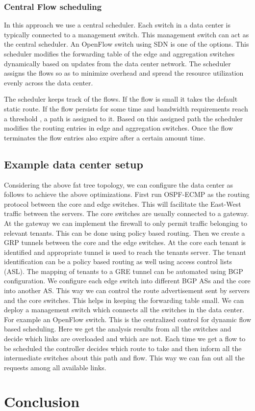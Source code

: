 \documentclass[11pt,letterpaper,onecolumn]{article}
\begin{document}
\subsubsection{Central Flow scheduling}
\par{\qquad In this approach we use a central scheduler. Each switch in a data center is typically connected to a management switch. This management switch can act as the central scheduler. An OpenFlow switch using SDN is one of the options. This scheduler modifies the forwarding table of the edge and aggregation switches dynamically based on updates from the data center network. The scheduler assigns the flows so as to minimize overhead and spread the resource utilization evenly across the data center.}\\

\par{The scheduler keeps track of the flows. If the flow is small it takes the default static route. If the flow persists for some time and bandwidth requirements reach a threshold , a path is assigned to it. Based on this assigned path the scheduler modifies the routing entries in edge and aggregation switches. Once the flow terminates the flow entries also expire after a certain amount time.}\\

\subsection{Example data center setup}
\par{\qquad Considering the above fat tree topology, we can configure the data center as follows to achieve the above optimizations. First run OSPF-ECMP as the routing protocol between the core and edge switches. This will facilitate the East-West traffic between the servers. The core switches are usually connected to a gateway. At the gateway we can implement the firewall to only permit traffic belonging to relevant tenants. This can be done using policy based routing. Then we create a GRP tunnels between the core and the edge switches. At the core each tenant is identified and appropriate tunnel is used to reach the tenants server\cite{headquarters2007cisco}. The tenant identification can be a policy based routing as well using access control lists (ASL). The mapping of tenants to a GRE tunnel can be automated using BGP configuration. We configure each edge switch into different BGP ASs and the core into another AS. This way we can control the route advertisement sent by servers and the core switches. This helps in keeping the forwarding table small. We can deploy a management switch which connects all the switches in the data center. For example an OpenFlow switch. This is the centralized control for dynamic flow based scheduling. Here we get the analysis results from all the switches and decide which links are overloaded and which are not. Each time we get a flow to be scheduled the controller decides which route to take and then inform all the intermediate switches about this path and flow. This way we can fan out all the requests among all available links. }\\


\section{Conclusion}



\RaggedRight
\newpage


\end{document}
